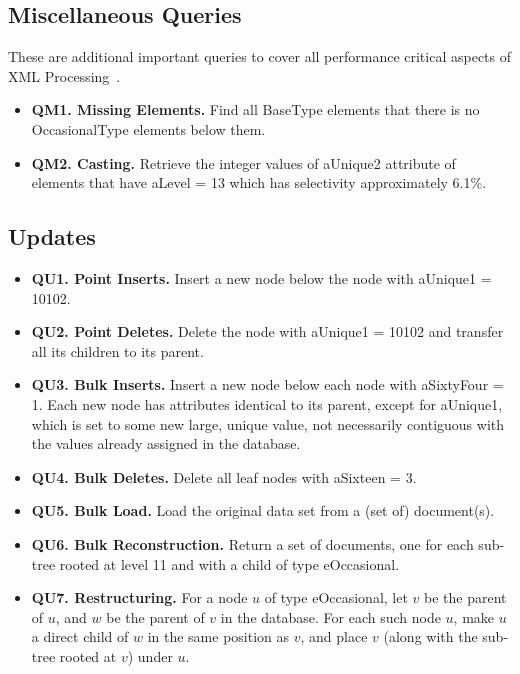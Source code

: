 \subsection{Miscellaneous Queries}
These are additional important queries to cover all performance
critical aspects of XML Processing~\cite{SIGMODRECORD01Bench}.
\begin {itemize}
\item {\bf QM1. Missing Elements.} Find all {\sf BaseType} elements that
there is no {\sf OccasionalType} elements below them.
\item {\bf QM2. Casting.} Retrieve the integer values of {\sf aUnique2}
attribute of elements that have {\sf aLevel = 13} which has selectivity
approximately 6.1\%.
\end{itemize}

\subsection{Updates}
\begin {itemize}
\item {\bf QU1. Point Inserts.} Insert a new node below the node with
{\sf aUnique1 = 10102}.

\item {\bf QU2. Point Deletes.} Delete the node with
{\sf aUnique1 = 10102} and transfer all its children to its parent.

\item {\bf QU3. Bulk Inserts.} Insert a new node below each node with
{\sf aSixtyFour = 1}.  Each new node has attributes identical to its parent,
except for {\sf aUnique1}, which is set to some new large, unique value, not
necessarily contiguous with the values already assigned in the database.

\item {\bf QU4. Bulk Deletes.} Delete all leaf nodes with {\sf aSixteen = 3}.

\item {\bf QU5. Bulk Load.} Load the original data set from a (set of) document(s).

\item {\bf QU6. Bulk Reconstruction.} Return a set of documents, one for each
sub-tree rooted at level 11 and with a child of type {\sf eOccasional}.

\item {\bf QU7. Restructuring.}
For a node $u$ of type {\sf eOccasional}, let $v$ be the parent of $u$, and
$w$ be the parent of $v$ in the database.  For each such node $u$, make $u$ a
direct child of $w$ in the same position as $v$, and place $v$ (along with
the sub-tree rooted at $v$) under $u$.
\end{itemize}








